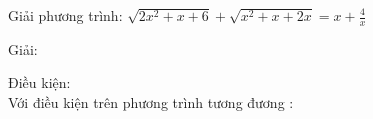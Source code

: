 \begin{vd}
  Giải phương trình: $ \sqrt{2x^2 +x +6} + \sqrt{x^2 +x +2x} = x + \frac{4}{x } $
\end{vd}
\begin{center}
    Giải:
\end{center}

Điều kiện: $  $ \\
Với điều kiện trên phương trình tương đương : \\

